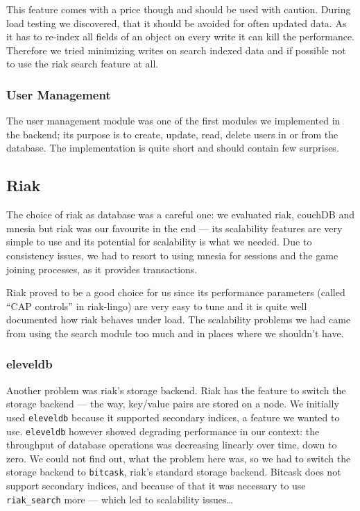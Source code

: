 \documentclass[11pt,a4paper]{report}
\begin{document}
This feature comes with a price though and should be used with caution.
During load testing we discovered, that it should be avoided for often updated data.
As it has to re-index all fields of an object on every write it can kill the performance.
Therefore we tried minimizing writes on search indexed data and if possible not
to use the riak search feature at all.

\subsubsection{User Management}
The user management module was one of the first modules we implemented in the
backend; its purpose is to create, update, read, delete users in or from the
database. The implementation is quite short and should contain few surprises.

\subsection{Riak}
The choice of riak as database was a careful one: we evaluated riak, couchDB
and mnesia but riak was our favourite in the end --- its scalability features
are very simple to use and its potential for scalability is what we needed.
Due to consistency issues, we had to resort to using mnesia for sessions and
the game joining processes, as it provides transactions.

Riak proved to be a good choice for us since its performance parameters (called
``CAP controls'' in riak-lingo) are very easy to tune and it is quite well
documented how riak behaves under load. The scalability problems we had
came from using the search module too much and in places where we shouldn't
have.
\subsubsection{eleveldb}
Another problem was riak's storage backend. Riak has the feature to switch the
storage backend --- the way, key/value pairs are stored on a node.
We initially used {\tt eleveldb} because it supported secondary indices, a
feature we wanted to use. {\tt eleveldb} however showed degrading performance
in our context: the throughput of database operations was decreasing linearly
over time, down to zero. We could not find out, what the problem here was, so
we had to switch the storage backend to {\tt bitcask}, riak's standard storage
backend. Bitcask does not support secondary indices, and because of that it was
necessary to use {\tt riak\_search} more --- which led to scalability
issues\ldots
\end{document}
